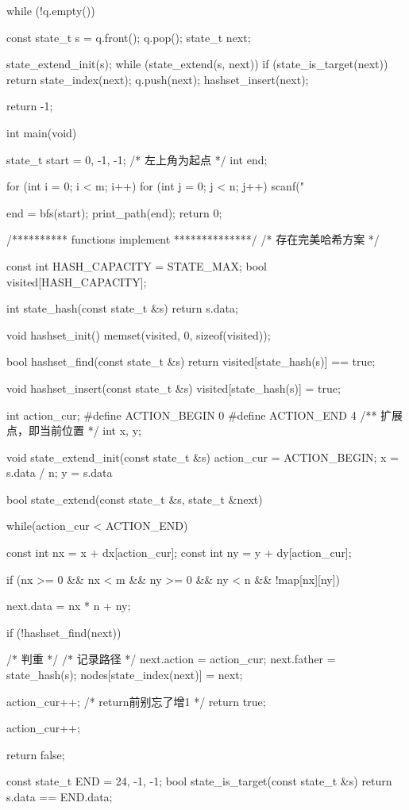 \begin{Codex}[label=maze.c]
{    while (!q.empty()) {
        const state_t s = q.front(); q.pop();
        state_t next;

        state_extend_init(s);
        while (state_extend(s, next)) {
            if (state_is_target(next)) {
                return state_index(next);
            }
            q.push(next);
            hashset_insert(next);
        }
    }
    return -1;
}

int main(void) {
    state_t start = {0, -1, -1}; /* 左上角为起点 */
    int end;

    for (int i = 0; i < m; i++) {
        for (int j = 0; j < n; j++) {
            scanf("%
        }
    }

    end = bfs(start);
    print_path(end);
    return 0;
}

/********** functions implement **************/
/* 存在完美哈希方案 */

const int HASH_CAPACITY = STATE_MAX;
bool visited[HASH_CAPACITY];

int state_hash(const state_t &s) {
    return s.data;
}

void hashset_init() {
    memset(visited, 0, sizeof(visited));
}

bool hashset_find(const state_t &s) {
    return visited[state_hash(s)] == true;
}

void hashset_insert(const state_t &s) {
    visited[state_hash(s)] = true;
}

int action_cur;
#define ACTION_BEGIN 0
#define ACTION_END 4
/** 扩展点，即当前位置 */
int x, y;

void state_extend_init(const state_t &s) {
    action_cur = ACTION_BEGIN;
    x = s.data / n;
    y = s.data %
}

bool state_extend(const state_t &s, state_t &next) {
    while(action_cur < ACTION_END) {
        const int nx = x + dx[action_cur];
        const int ny = y + dy[action_cur];

        if (nx >= 0 && nx < m && ny >= 0 && ny < n && !map[nx][ny]) {
            next.data = nx * n + ny;

            if (!hashset_find(next)) { /* 判重 */
                /* 记录路径 */
                next.action = action_cur;
                next.father = state_hash(s);
                nodes[state_index(next)] = next;

                action_cur++;  /* return前别忘了增1 */
                return true;
            }
        }
        action_cur++;
    }
    return false;
}

const state_t END = {24, -1, -1};
bool state_is_target(const state_t &s) {
    return s.data == END.data;
}
\end{Codex}

